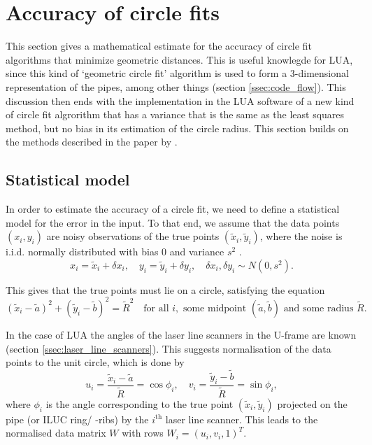 \section{Accuracy of circle fits} \label{sec:accuracy}
This section gives a mathematical estimate for the accuracy of circle fit algorithms that minimize geometric distances. This is useful knowlegde for LUA, since this kind of `geometric circle fit' algorithm is used to form a 3-dimensional representation of the pipes, among other things (section \ref{ssec:code_flow}). This discussion then ends with the implementation in the LUA software of a new kind of circle fit algrorithm that has a variance that is the same as the least squares method, but no bias in its estimation of the circle radius. This section builds on the methods described in the paper by \citeauthor{alsharadqah_chernov_circle_fitting} \cite{alsharadqah_chernov_circle_fitting}.

\subsection{Statistical model}
In order to estimate the accuracy of a circle fit, we need to define a statistical model for the error in the input. To that end, we assume that the data points $(x_i, y_i)$ are noisy observations of the true points $(\tilde{x}_i, \tilde{y}_i)$, where the noise is i.i.d. normally distributed with bias 0 and variance $s^2$ \cite[section 2]{alsharadqah_chernov_circle_fitting}.
\begin{equation}
    x_i = \tilde{x}_i + \delta x_i, \quad y_i = \tilde{y}_i + \delta y_i, \quad \delta x_i, \delta y_i \sim N(0, s^2).
\end{equation}

This gives that the true points must lie on a circle, satisfying the equation
\begin{equation}
    (\tilde{x}_i - \tilde{a})^2 + (\tilde{y}_i - \tilde{b})^2 = \tilde{R}^2 \quad \text{for all } i, \text{ some midpoint } (\tilde{a}, \tilde{b}) \text{ and some radius } \tilde{R}.
\end{equation}

In the case of LUA the angles of the laser line scanners in the U-frame are known (section \ref{ssec:laser_line_scanners}). This suggests normalisation of the data points to the unit circle, which is done by
\begin{equation}
    u_i = \frac{\tilde{x}_i - \tilde{a}}{\tilde{R}} = \cos{\phi_i}, \quad v_i = \frac{\tilde{y}_i - \tilde{b}}{\tilde{R}} = \sin{\phi_i},
\end{equation}
where $\phi_i$ is the angle corresponding to the true point $(\tilde{x}_i, \tilde{y}_i)$ projected on the pipe (or ILUC ring/ -ribs) by the $i^{\text{th}}$ laser line scanner. This leads to the normalised data matrix $W$ with rows $W_i = (u_i, v_i, 1)^T$.

